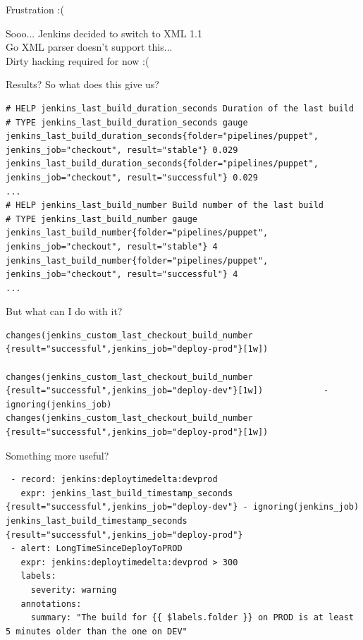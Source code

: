 \documentclass[aspectratio=169,12pt]{beamer}
\begin{document}
\begin{frame}{Frustration :(}
  \begin{center}
    Sooo... Jenkins decided to switch to XML 1.1 \\
    \vspace{20pt}
    Go XML parser doesn't support this... \\
    \vspace{20pt}
    Dirty hacking required for now :(
  \end{center}
\end{frame}

\begin{frame}[fragile]{Results?}
  So what does this give us?
  \begin{verbatim}
# HELP jenkins_last_build_duration_seconds Duration of the last build
# TYPE jenkins_last_build_duration_seconds gauge
jenkins_last_build_duration_seconds{folder="pipelines/puppet", jenkins_job="checkout", result="stable"} 0.029
jenkins_last_build_duration_seconds{folder="pipelines/puppet", jenkins_job="checkout", result="successful"} 0.029
...
# HELP jenkins_last_build_number Build number of the last build
# TYPE jenkins_last_build_number gauge
jenkins_last_build_number{folder="pipelines/puppet", jenkins_job="checkout", result="stable"} 4
jenkins_last_build_number{folder="pipelines/puppet", jenkins_job="checkout", result="successful"} 4
...
  \end{verbatim}
\end{frame}

\begin{frame}[fragile]{But what can I do with it?}
  \begin{verbatim}
changes(jenkins_custom_last_checkout_build_number {result="successful",jenkins_job="deploy-prod"}[1w])

changes(jenkins_custom_last_checkout_build_number {result="successful",jenkins_job="deploy-dev"}[1w])            - ignoring(jenkins_job) changes(jenkins_custom_last_checkout_build_number {result="successful",jenkins_job="deploy-prod"}[1w])
  \end{verbatim}
\end{frame}

\begin{frame}[fragile]{Something more useful?}
  \begin{verbatim}
 - record: jenkins:deploytimedelta:devprod
   expr: jenkins_last_build_timestamp_seconds {result="successful",jenkins_job="deploy-dev"} - ignoring(jenkins_job) jenkins_last_build_timestamp_seconds {result="successful",jenkins_job="deploy-prod"}
 - alert: LongTimeSinceDeployToPROD
   expr: jenkins:deploytimedelta:devprod > 300
   labels:
     severity: warning
   annotations:
     summary: "The build for {{ $labels.folder }} on PROD is at least 5 minutes older than the one on DEV"
  \end{verbatim}
\end{frame}
\end{document}
